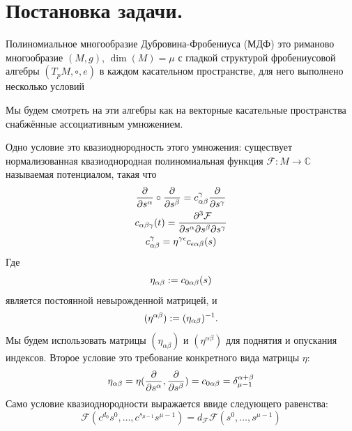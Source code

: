 \section{Постановка задачи.}
\begin{defin}[МДФ]
	Полиномиальное многообразие Дубровина-Фробениуса (МДФ) это риманово многообразие \((M, g)\), \(\operatorname{dim}(M) = \mu\) с гладкой структурой фробениусовой алгебры \((T_pM, \circ, e)\) в каждом касательном пространстве, для него выполнено несколько условий
\end{defin}

Мы будем смотреть на эти алгебры как на векторные касательные пространства снабжённые ассоциативным умножением.\par
Одно условие это квазиоднородность этого умножения: существует нормализованная квазиоднородная полиномиальная функция \(\mathcal{F}: M \to \mathbb{C}\) называемая потенциалом, такая что  \begin{equation}
	\begin{gathered}
		\tang[s^\alpha] \circ \tang[s^\beta] = c^\gamma_{\alpha\beta}\tang[s^{\gamma}]\\
		c_{\alpha\beta\gamma}(t) = \dfrac{\partial^3 \mathcal{F}}{\partial s^{\alpha}\partial s^{\beta}\partial s^{\gamma}}\\
		c^\gamma_{\alpha\beta} = \eta^{\gamma\epsilon}c_{\epsilon\alpha\beta}(s)
	\end{gathered}
\end{equation}
Где
\[
\eta_{\alpha\beta} \defeq c_{0\alpha\beta}(s)
\]
является постоянной невырожденной матрицей, и
\[
(\eta^{\alpha\beta}) \defeq (\eta_{\alpha\beta})^{-1}.
\]
Мы будем использовать матрицы \((\eta_{\alpha\beta})\) и \((\eta^{\alpha\beta})\) для поднятия и опускания индексов. Второе условие это требование конкретного вида матрицы \(\eta\):
\begin{gather} \eta_{\alpha\beta} = \eta(\tang[s^\alpha], \tang[s^\beta]) = c_{0\alpha\beta} = \delta^{\alpha + \beta}_{\mu-1}
\end{gather}
Само условие квазиоднородности выражается ввиде следующего равенства:
\[\mathcal{F}(c^{d_0}s^0, \dots, c^{s_{\mu-1}}s^{\mu-1}) = d_\mathcal{F}\mathcal{F}(s^0,\dots, s^{\mu-1})\]
